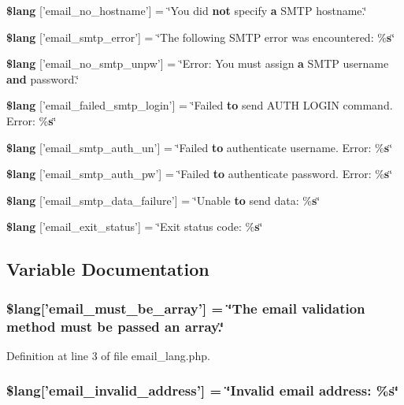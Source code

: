 \begin{DoxyCompactItemize}
\item 
{\bf \$lang} ['email\-\_\-no\-\_\-hostname'] = \char`\"{}You did {\bf not} specify {\bf a} S\-M\-T\-P hostname.\char`\"{}
\item 
{\bf \$lang} ['email\-\_\-smtp\-\_\-error'] = \char`\"{}The following S\-M\-T\-P error was encountered\-: \%{\bf s}\char`\"{}
\item 
{\bf \$lang} ['email\-\_\-no\-\_\-smtp\-\_\-unpw'] = \char`\"{}Error\-: You must assign {\bf a} S\-M\-T\-P username {\bf and} password.\char`\"{}
\item 
{\bf \$lang} ['email\-\_\-failed\-\_\-smtp\-\_\-login'] = \char`\"{}Failed {\bf to} send A\-U\-T\-H L\-O\-G\-I\-N command. Error\-: \%{\bf s}\char`\"{}
\item 
{\bf \$lang} ['email\-\_\-smtp\-\_\-auth\-\_\-un'] = \char`\"{}Failed {\bf to} authenticate username. Error\-: \%{\bf s}\char`\"{}
\item 
{\bf \$lang} ['email\-\_\-smtp\-\_\-auth\-\_\-pw'] = \char`\"{}Failed {\bf to} authenticate password. Error\-: \%{\bf s}\char`\"{}
\item 
{\bf \$lang} ['email\-\_\-smtp\-\_\-data\-\_\-failure'] = \char`\"{}Unable {\bf to} send data\-: \%{\bf s}\char`\"{}
\item 
{\bf \$lang} ['email\-\_\-exit\-\_\-status'] = \char`\"{}Exit status code\-: \%{\bf s}\char`\"{}
\end{DoxyCompactItemize}


\subsection{Variable Documentation}
\subsubsection[{\$lang}]{\setlength{\rightskip}{0pt plus 5cm}\$lang['email\-\_\-must\-\_\-be\-\_\-array'] = \char`\"{}The email validation method must be passed an array.\char`\"{}}\label{email__lang_8php_ac8c4b077e854bbdbb9a37b2d7f7c47fc}


Definition at line 3 of file email\-\_\-lang.\-php.

\subsubsection[{\$lang}]{\setlength{\rightskip}{0pt plus 5cm}\$lang['email\-\_\-invalid\-\_\-address'] = \char`\"{}Invalid email address\-: \%{\bf s}\char`\"{}}\label{email__lang_8php_a37759f6c728f3aaf8df6ca5bb8a3e832}


